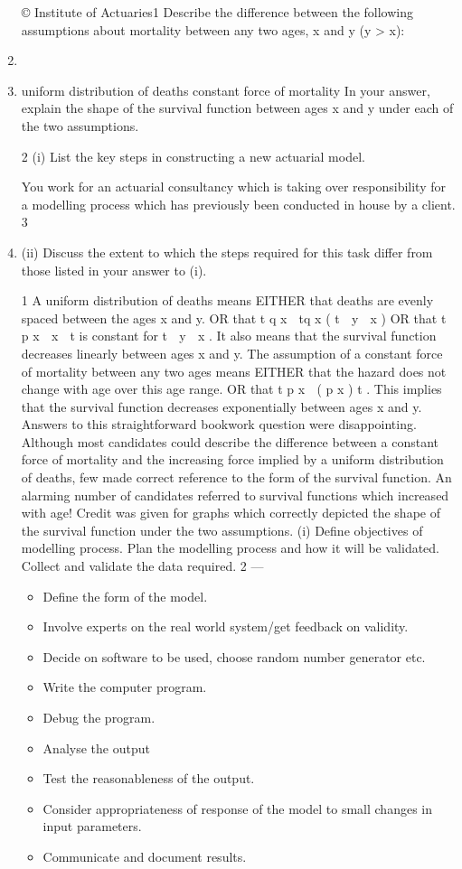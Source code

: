 \documentclass[a4paper,12pt]{article}
\begin{document}
\begin{enumerate}
© Institute of Actuaries1
Describe the difference between the following assumptions about mortality between
any two ages, x and y (y > x):
\item
\item
uniform distribution of deaths
constant force of mortality
In your answer, explain the shape of the survival function between ages x and y under
each of the two assumptions.

2
(i)
List the key steps in constructing a new actuarial model.

You work for an actuarial consultancy which is taking over responsibility for a
modelling process which has previously been conducted in house by a client.
3
\item (ii) Discuss the extent to which the steps required for this task differ from those
listed in your answer to (i).



1
A uniform distribution of deaths means
EITHER
that deaths are evenly spaced between the ages x and y.
OR
that t q x  tq x
( t  y  x )
OR
that t p x  x  t is constant for t  y  x .
It also means that the survival function decreases linearly between ages x and y. The
assumption of a constant force of mortality between any two ages means
EITHER
that the hazard does not change with age over this age range.
OR
that t p x  ( p x ) t .
This implies that the survival function decreases exponentially between ages x and y.
Answers to this straightforward bookwork question were disappointing. Although
most candidates could describe the difference between a constant force of mortality
and the increasing force implied by a uniform distribution of deaths, few made correct reference to the form of the survival function. An alarming number of candidates
referred to survival functions which increased with age! Credit was given for graphs which correctly depicted the shape of the survival function under the two
assumptions.
(i) Define objectives of modelling process.
Plan the modelling process and how it will be validated.
Collect and validate the data required.
2  — %
\begin{itemize}
\item Define the form of the model.
\item Involve experts on the real world system/get feedback on validity.
\item Decide on software to be used, choose random number generator etc.
\item Write the computer program.
\item Debug the program.
\item Analyse the output
\item Test the reasonableness of the output.
\item Consider appropriateness of response of the model to small changes in input
parameters.
\item Communicate and document results.
\end{itemize}


\end{enumerate}
\end{document}
